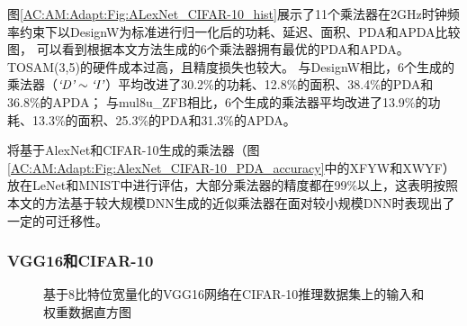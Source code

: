 图\ref{AC:AM:Adapt:Fig:ALexNet_CIFAR-10_hist}展示了11个乘法器在2GHz时钟频率约束下以DesignW为标准进行归一化后的功耗、延迟、面积、PDA和APDA比较图，
可以看到根据本文方法生成的6个乘法器拥有最优的PDA和APDA。TOSAM(3,5)的硬件成本过高，且精度损失也较大。
与DesignW相比，6个生成的乘法器（$\emph{`D'} \sim \emph{`I'}$）平均改进了30.2\%的功耗、12.8\%的面积、38.4\%的PDA和36.8\%的APDA；
与mul8u\_ZFB相比，6个生成的乘法器平均改进了13.9\%的功耗、13.3\%的面积、25.3\%的PDA和31.3\%的APDA。

将基于AlexNet和CIFAR-10生成的乘法器（图\ref{AC:AM:Adapt:Fig:AlexNet_CIFAR-10_PDA_accuracy}中的XFYW和XWYF）放在LeNet和MNIST中进行评估，大部分乘法器的精度都在99\%以上，这表明按照本文的方法基于较大规模DNN生成的近似乘法器在面对较小规模DNN时表现出了一定的可迁移性。


\subsubsection{VGG16和CIFAR-10}

\begin{figure}[!h]
    \centering
    \centering
    \caption{基于8比特位宽量化的VGG16网络在CIFAR-10推理数据集上的输入和权重数据直方图}
    \label{DNN:LeNet:Fig:VGG16_CIFAR-10_distribution}
\end{figure}

